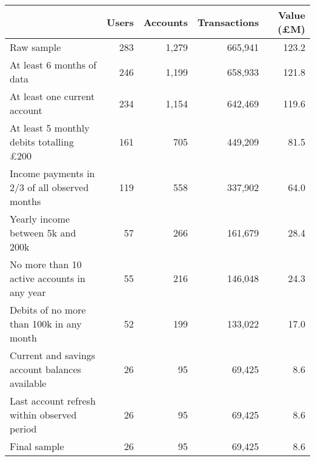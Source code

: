 \begin{tabular}{lrrrr}
\toprule
                                               & Users & Accounts & Transactions & Value (\pounds M) \\
\midrule
                                    Raw sample &   283 &    1,279 &      665,941 &             123.2 \\
                     At least 6 months of data &   246 &    1,199 &      658,933 &             121.8 \\
                  At least one current account &   234 &    1,154 &      642,469 &             119.6 \\
At least 5 monthly debits totalling \pounds200 &   161 &      705 &      449,209 &              81.5 \\
 Income payments in 2/3 of all observed months &   119 &      558 &      337,902 &              64.0 \\
             Yearly income between 5k and 200k &    57 &      266 &      161,679 &              28.4 \\
   No more than 10 active accounts in any year &    55 &      216 &      146,048 &              24.3 \\
      Debits of no more than 100k in any month &    52 &      199 &      133,022 &              17.0 \\
Current and savings account balances available &    26 &       95 &       69,425 &               8.6 \\
   Last account refresh within observed period &    26 &       95 &       69,425 &               8.6 \\
                                  Final sample &    26 &       95 &       69,425 &               8.6 \\
\bottomrule
\end{tabular}

